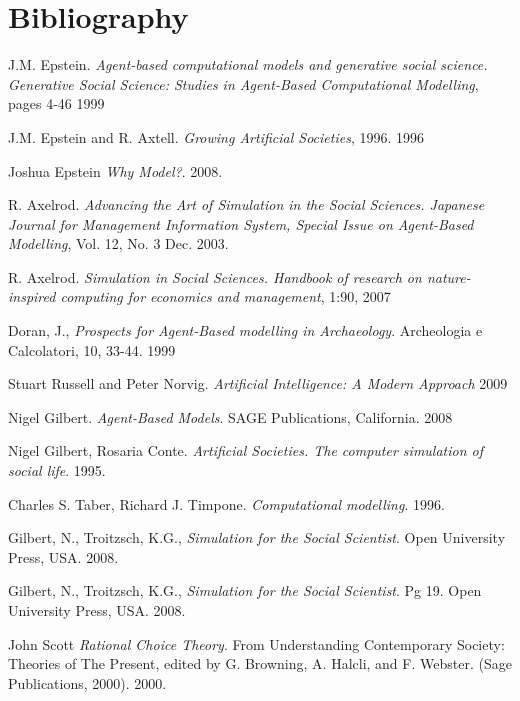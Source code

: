 \documentclass[11pt,oneside,a4paper,openright]{report}
\begin{document}
\chapter{Bibliography}
\begin{thebibliography}{13}

	J.M. Epstein. 
	\emph{Agent-based computational models and generative social science. Generative Social
	Science: Studies in Agent-Based Computational Modelling}, pages 4-46
	1999

	J.M. Epstein and R. Axtell.
	\emph{Growing Artificial Societies}, 1996.
	1996

	Joshua Epstein
	\emph{Why Model?}.
	2008.

	R. Axelrod. 
	\emph{Advancing the Art of Simulation in the Social Sciences. Japanese Journal for Management Information System, Special Issue on Agent-Based Modelling}, Vol. 12, No. 3 
	Dec. 2003. 

	R. Axelrod. 
	\emph{Simulation in Social Sciences. Handbook of research on nature-inspired computing for economics and management}, 1:90, 
	2007

	Doran, J., 
	\emph{Prospects for Agent-Based modelling in Archaeology}. Archeologia e Calcolatori, 10, 33-44.
	1999

	Stuart Russell and Peter Norvig.
	\emph{Artificial Intelligence: A Modern Approach}
	2009

	Nigel Gilbert.
	\emph{Agent-Based Models}. SAGE Publications, California.
	2008

	Nigel Gilbert, Rosaria Conte.
	\emph{Artificial Societies. The computer simulation of social life}.
	1995.

	Charles S. Taber, Richard J. Timpone.
	\emph{Computational modelling}.
	1996.

	Gilbert, N., Troitzsch, K.G.,
	\emph{Simulation for the Social Scientist}. Open University Press, USA.
	2008.

	Gilbert, N., Troitzsch, K.G.,
	\emph{Simulation for the Social Scientist}. Pg 19. Open University Press, USA.
	2008.

	John Scott
	\emph{Rational Choice Theory}. From Understanding Contemporary Society: Theories of The Present, edited by G. Browning,
	A. Halcli, and F. Webster. (Sage Publications, 2000).
	2000.


\end{thebibliography}
\end{document}
